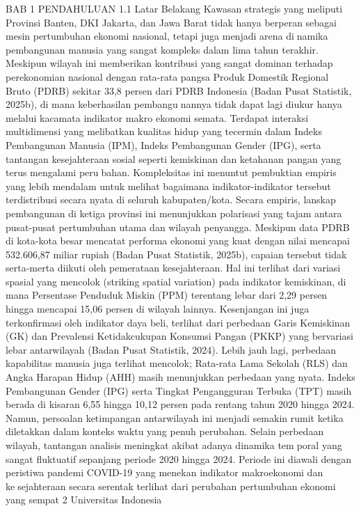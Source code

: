 BAB 1
PENDAHULUAN
1.1 Latar Belakang
Kawasan strategis yang meliputi Provinsi Banten, DKI Jakarta, dan Jawa Barat tidak
hanya berperan sebagai mesin pertumbuhan ekonomi nasional, tetapi juga menjadi arena dinamika pembangunan manusia yang sangat kompleks dalam lima tahun terakhir. Meskipun
wilayah ini memberikan kontribusi yang sangat dominan terhadap perekonomian nasional
dengan rata-rata pangsa Produk Domestik Regional Bruto (PDRB) sekitar 33,8 persen
dari PDRB Indonesia (Badan Pusat Statistik, 2025b), di mana keberhasilan pembangunannya tidak dapat lagi diukur hanya melalui kacamata indikator makro ekonomi semata.
Terdapat interaksi multidimensi yang melibatkan kualitas hidup yang tecermin dalam
Indeks Pembangunan Manusia (IPM), Indeks Pembangunan Gender (IPG), serta tantangan
kesejahteraan sosial seperti kemiskinan dan ketahanan pangan yang terus mengalami perubahan. Kompleksitas ini menuntut pembuktian empiris yang lebih mendalam untuk melihat
bagaimana indikator-indikator tersebut terdistribusi secara nyata di seluruh kabupaten/kota.
Secara empiris, lanskap pembangunan di ketiga provinsi ini menunjukkan polarisasi
yang tajam antara pusat-pusat pertumbuhan utama dan wilayah penyangga. Meskipun data
PDRB di kota-kota besar mencatat performa ekonomi yang kuat dengan nilai mencapai
532.606,87 miliar rupiah (Badan Pusat Statistik, 2025b), capaian tersebut tidak serta-merta
diikuti oleh pemerataan kesejahteraan. Hal ini terlihat dari variasi spasial yang mencolok
(striking spatial variation) pada indikator kemiskinan, di mana Persentase Penduduk
Miskin (PPM) terentang lebar dari 2,29 persen hingga mencapai 15,06 persen di wilayah
lainnya. Kesenjangan ini juga terkonfirmasi oleh indikator daya beli, terlihat dari perbedaan
Garis Kemiskinan (GK) dan Prevalensi Ketidakcukupan Konsumsi Pangan (PKKP) yang
bervariasi lebar antarwilayah (Badan Pusat Statistik, 2024). Lebih jauh lagi, perbedaan
kapabilitas manusia juga terlihat mencolok; Rata-rata Lama Sekolah (RLS) dan Angka
Harapan Hidup (AHH) masih menunjukkan perbedaan yang nyata. Indeks Pembangunan
Gender (IPG) serta Tingkat Pengangguran Terbuka (TPT) masih berada di kisaran 6,55
hingga 10,12 persen pada rentang tahun 2020 hingga 2024. Namun, persoalan ketimpangan
antarwilayah ini menjadi semakin rumit ketika diletakkan dalam konteks waktu yang penuh
perubahan.
Selain perbedaan wilayah, tantangan analisis meningkat akibat adanya dinamika temporal yang sangat fluktuatif sepanjang periode 2020 hingga 2024. Periode ini diawali
dengan peristiwa pandemi COVID-19 yang menekan indikator makroekonomi dan kesejahteraan secara serentak terlihat dari perubahan pertumbuhan ekonomi yang sempat
2 Universitas Indonesia

